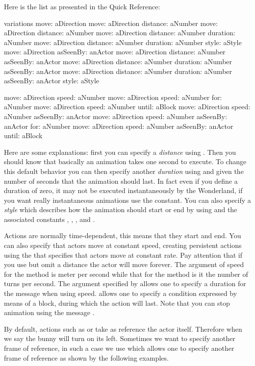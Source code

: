 Here is the list as presented in the Quick Reference: 
\begin{scriptwithtitle}{ variations}
move: aDirection
move: aDirection distance: aNumber
move: aDirection distance: aNumber
move: aDirection distance: aNumber duration: aNumber
move: aDirection distance: aNumber duration: aNumber style: aStyle
move: aDirection asSeenBy: anActor
move: aDirection distance: aNumber asSeenBy: anActor
move: aDirection distance: aNumber duration: aNumber asSeenBy: anActor
move: aDirection distance: aNumber duration: aNumber asSeenBy: anActor style: aStyle

move: aDirection speed: aNumber
move: aDirection speed: aNumber for: aNumber
move: aDirection speed: aNumber until: aBlock
move: aDirection speed: aNumber asSeenBy: anActor
move: aDirection speed: aNumber asSeenBy: anActor for: aNumber
move: aDirection speed: aNumber asSeenBy: anActor until: aBlock
\end{scriptwithtitle}

Here are some explanations:  first you can specify a \textit{distance} using .  Then you should know that basically an animation takes one second to execute. To change this default behavior you can then specify another \textit{duration} using  and given the number of seconds that the animation should last.  In fact even if you define a duration of zero, it may not be executed instantaneously by the Wonderland, if you want really instantaneous animations use the  constant. You can also specify a \textit{style} which describes how the animation should start or end by using  and the associated constants , , , and .

Actions are normally time-dependent, this means that they start and end. You can also specify that actors move at constant speed, creating persistent actions using the 
  that specifies that actors move at constant rate. Pay attention that if you use  but omit a distance the actor will move forever. The argument of speed for the  method is meter per second while that for the method  is it the number of turns per second. The argument specified by  allows one to specify a duration for the message when using speed.  allows one to specify a condition expressed by means of a block, during which the action will last. 
Note that you can stop animation using the message .

By default, actions such as  or  take as reference the actor itself. Therefore when we say  the bunny will turn on its left. Sometimes we want to specify another frame of reference, in such a case we use 
 which allows one to specify another frame of reference as shown by the following examples.

